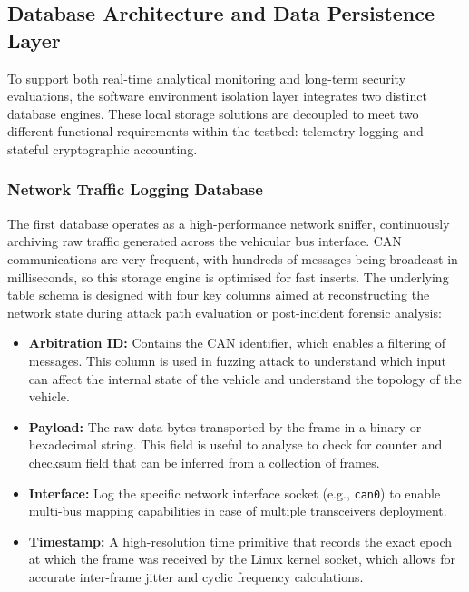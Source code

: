 \subsection{Database Architecture and Data Persistence Layer}
To support both real-time analytical monitoring and long-term security evaluations, the software environment isolation layer integrates two distinct database engines. These local storage solutions are decoupled to meet two different functional requirements within the testbed: telemetry logging and stateful cryptographic accounting.

\subsubsection*{Network Traffic Logging Database}

The first database operates as a high-performance network sniffer, continuously archiving raw traffic generated across the vehicular bus interface. \gls{CAN} communications are very frequent, with hundreds of messages being broadcast in milliseconds, so this storage engine is optimised for fast inserts. The underlying table schema is designed with four key columns aimed at reconstructing the network state during attack path evaluation or post-incident forensic analysis:
\begin{itemize}
    \item \textbf{Arbitration ID:} Contains the \gls{CAN} identifier, which enables a filtering of messages. This column is used in fuzzing attack to understand which input can affect the internal state of the vehicle and understand the topology of the vehicle.
    \item \textbf{Payload:} The raw data  bytes transported by the frame in a binary or hexadecimal string. This field is useful to analyse to check for counter and checksum field that can be inferred from a collection of frames.
    \item \textbf{Interface:} Log the specific network interface socket (e.g., \texttt{can0}) to enable multi-bus mapping capabilities in case of multiple transceivers deployment.
    \item \textbf{Timestamp:} A high-resolution time primitive that records the exact epoch at which the frame was received by the Linux kernel socket, which allows for accurate inter-frame jitter and cyclic frequency calculations.
\end{itemize}

